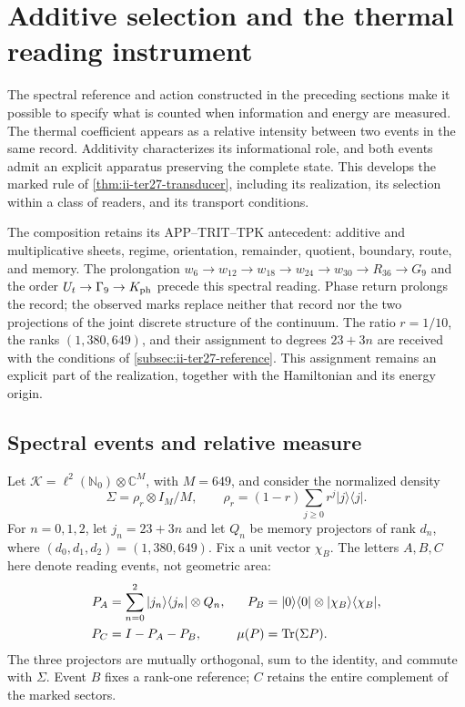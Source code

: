 \section{Additive selection and the thermal reading instrument}
\label{sec:ii-aditiva-instrumento}

The spectral reference and action constructed in the preceding sections
make it possible to specify what is counted when information and energy
are measured. The thermal coefficient appears as a relative intensity
between two events in the same record. Additivity characterizes its
informational role, and both events admit an explicit apparatus preserving
the complete state. This develops the marked rule of
\ref{thm:ii-ter27-transducer}, including its realization, its selection
within a class of readers, and its transport conditions.

The composition retains its APP--TRIT--TPK antecedent: additive and
multiplicative sheets, regime, orientation, remainder, quotient, boundary,
route, and memory. The prolongation
$w_6\to w_{12}\to w_{18}\to w_{24}\to w_{30}\to R_{36}\to G_9$
and the order $U_t\to\Gamma_9\to K_{\rm ph}$ precede this spectral
reading. Phase return prolongs the record; the observed marks replace
neither that record nor the two projections of the joint discrete structure
of the continuum. The ratio $r=1/10$, the ranks $(1,380,649)$, and their
assignment to degrees $23+3n$ are received with the conditions of
\ref{subsec:ii-ter27-reference}. This assignment remains an explicit
part of the realization, together with the Hamiltonian and its energy origin.

\subsection{Spectral events and relative measure}
\label{subsec:ii-tins-eventos}

Let $\mathcal K=\ell^2(\mathbb N_0)\otimes\mathbb C^M$, with $M=649$,
and consider the normalized density
\begin{equation}
 \Sigma=\rho_r\otimes I_M/M,\qquad
 \rho_r=(1-r)\sum_{j\ge0}r^j|j\rangle\langle j|.
 \label{eq:ii-tins-sigma}
\end{equation}
For $n=0,1,2$, let $j_n=23+3n$ and let $Q_n$ be memory projectors of rank
$d_n$, where $(d_0,d_1,d_2)=(1,380,649)$. Fix a unit vector $\chi_B$.
The letters $A,B,C$ here denote reading events, not geometric area:
\begin{align}
 P_A&=\sum_{n=0}^2|j_n\rangle\langle j_n|\otimes Q_n,&
 P_B&=|0\rangle\langle0|\otimes|\chi_B\rangle\langle \chi_B|,
 \nonumber\\
 P_C&=I-P_A-P_B,& \mu(P)&=\operatorname{Tr}(\Sigma P).
 \label{eq:ii-tins-marks}
\end{align}
The three projectors are mutually orthogonal, sum to the identity, and
commute with $\Sigma$. Event $B$ fixes a rank-one reference; $C$ retains
the entire complement of the marked sectors.

